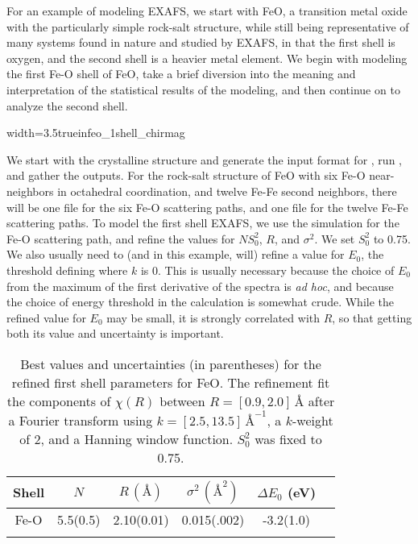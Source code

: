 For an example of modeling EXAFS, we start with FeO, a transition metal
oxide with the particularly simple rock-salt structure, while still being
representative of many systems found in nature and studied by EXAFS, in
that the first shell is oxygen, and the second shell is a heavier metal
element.  We begin with modeling the first Fe-O shell of FeO, take a brief
diversion into  the meaning and interpretation of the statistical results
of the modeling, and then continue on to analyze the second shell.

\begin{Nfig}{width=3.5truein}{feo_1shell_chirmag}
  \caption{First shell fit to the EXAFS of FeO, showing the magnitude of
    the Fourier transform of the EXAFS,  $|\chi(R)|$, for data (blue) and
    best fit model (red).}
  \label{Fig:FIT:feo1a}
\end{Nfig}

We start with the crystalline structure and generate the input format for
{\feff}, run {\feff}, and gather the outputs.  For the rock-salt structure
of FeO with six Fe-O near-neighbors in octahedral coordination, and twelve
Fe-Fe second neighbors, there will be one file for the six Fe-O scattering
paths, and one file for the twelve Fe-Fe scattering paths.  To model the
first shell EXAFS, we use the simulation for the Fe-O scattering path, and
refine the values for $NS_0^2$, $R$, and $\sigma^2$.  We set $S_0^2$ to
0.75.  We also usually need to (and in this example, will) refine a value
for $E_0$, the threshold defining where $k$ is 0.  This is usually
necessary because the choice of $E_0$ from the maximum of the first
derivative of the spectra is {\emph{ad hoc}}, and because the choice of
energy threshold in the calculation is somewhat crude.  While the refined
value for $E_0$ may be small, it is strongly correlated with $R$, so that
getting both its value and uncertainty is important.

\begin{table}[tbh]
  \caption{Best values and uncertainties (in parentheses) for the
    refined first shell parameters for FeO.  The refinement fit the
    components of $\chi(R)$ between $R=[0.9, 2.0]\,\text{\AA}$ after a Fourier
    transform using $k=[2.5, 13.5]\,\text{\AA}^{-1}$, a $k$-weight of 2, and a
    Hanning window function.  $S_0^2$ was fixed to 0.75.}
  \label{TABLE:FIT:feo1}
  \begin{center}
    \begin{tabular}{cccccc}
    Shell & ${N}$ & ${R}\, (\text{\AA})$ & ${\sigma^2}\, ({\text{\AA}^2})$ & ${\Delta E_0}$ (eV) \\
    \hline    \noalign{\smallskip}
    Fe-O  &  5.5(0.5) & 2.10(0.01) & 0.015(.002) & -3.2(1.0) \\
    \noalign{\smallskip}
    \hline
  \end{tabular}
\end{center}
\end{table}

